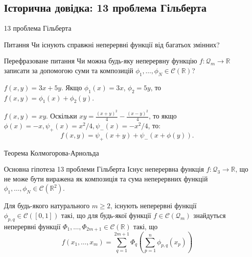 \documentclass{zkdl-presentation-template}
\begin{document}
    \subsection{Історична довідка: 13 проблема Гільберта}
    \begin{frame}{13 проблема Гільберта}
        \begin{alertblock}{Питання}
            Чи існують справжні неперервні функції від багатьох змінних?
        \end{alertblock}

        \begin{alertblock}{Перефразоване питання}
            Чи можна будь-яку неперервну функцію $f: \mathcal{Q}_m \to
            \mathbb{R}$ записати за допомогою суми та композицій
            $\phi_1,\dots,\phi_N \in \mathcal{C}(\mathbb{R})$?
        \end{alertblock}

        \begin{example}
            $f(x,y) = 3x+5y$. Якщо
            $\phi_1(x)=3x$, $\phi_2=5y$, то 
            $f(x,y) = \phi_1(x)+\phi_2(y)$.
        \end{example}

        \begin{example}
            $f(x,y) = xy$. Оскільки $xy=\frac{(x+y)^2}{4} - \frac{(x-y)^2}{4}$, 
            то якщо $\phi(x)=-x,\psi_+(x)=x^2/4,\psi_-(x)=-x^2/4$, то:
            \begin{equation*}
                f(x,y) = \psi_+(x+y) + \psi_-(x+\phi(y)).
            \end{equation*}
        \end{example}
    \end{frame}

    \begin{frame}{Теорема Колмогорова-Арнольда}
        \begin{block}{Основна гіпотеза 13 проблеми Гільберта}
            Існує неперервна функція $f: \mathcal{Q}_3 \to \mathbb{R}$, що не може бути
            виражена як композиція та сума неперервних функцій $\phi_1,\dots,\phi_N \in
            \mathcal{C}(\mathbb{R}^2)$.
        \end{block}

        \begin{definition}
            Для будь-якого натурального $m \geq 2$, існують неперервні функції
            $\phi_{p,q} \in \mathcal{C}([0,1])$ такі, що для будь-якої функції $f \in
            \mathcal{C}(\mathcal{Q}_m)$ знайдуться неперервні функції
            $\Phi_1,\dots,\Phi_{2m+1} \in \mathcal{C}(\mathbb{R})$ такі, що
            \begin{equation*}
                f(x_1,\dots,x_m) = \sum_{q=1}^{2m+1}\Phi_q\left(\sum_{p=1}^n \phi_{p,q}(x_p)\right)
            \end{equation*}
        \end{definition}
    \end{frame}
\end{document}
